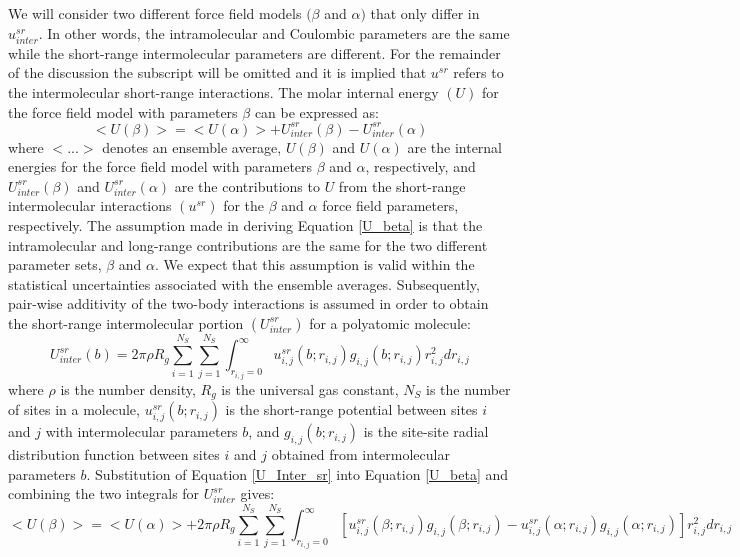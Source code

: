 \documentclass[12pt]{article}
\begin{document}
We will consider two different force field models $(\beta$ and $\alpha)$ that only differ in $u_{inter}^{sr}$. In other words, the intramolecular and Coulombic parameters are the same while the short-range intermolecular parameters are different. For the remainder of the discussion the subscript will be omitted and it is implied that $u^{sr}$ refers to the intermolecular short-range interactions. The molar internal energy $(U)$ for the force field model with parameters $\beta$ can be expressed as:
\begin{equation} \label{U_beta}
<U(\beta)> = <U(\alpha)> + U_{inter}^{sr}(\beta) - U_{inter}^{sr}(\alpha)
\end{equation}
where $<...>$ denotes an ensemble average, $U(\beta)$ and $U(\alpha)$ are the internal energies for the force field model with parameters $\beta$ and $\alpha$, respectively, and $U_{inter}^{sr}(\beta)$ and $U_{inter}^{sr}(\alpha)$ are the contributions to $U$ from the short-range intermolecular interactions $(u^{sr})$ for the $\beta$ and $\alpha$ force field parameters, respectively. The assumption made in deriving Equation \ref{U_beta} is that the intramolecular and long-range contributions are the same for the two different parameter sets, $\beta$ and $\alpha$. We expect that this assumption is valid within the statistical uncertainties associated with the ensemble averages. Subsequently, pair-wise additivity of the two-body interactions is assumed in order to obtain the short-range intermolecular portion $(U_{inter}^{sr})$ for a polyatomic molecule:
\begin{equation} \label{U_Inter_sr}
U_{inter}^{sr}(b) = 2 \pi \rho R_g \sum_{i=1}^{N_S} \sum_{j=1}^{N_S} \int_{r_{i,j}=0}^{\infty} u_{i,j}^{sr}(b;r_{i,j}) g_{i,j}(b;r_{i,j}) r_{i,j}^2 dr_{i,j}
\end{equation}
where $\rho$ is the number density, $R_g$ is the universal gas constant, $N_S$ is the number of sites in a molecule, $u_{i,j}^{sr}(b;r_{i,j})$ is the short-range potential between sites $i$ and $j$ with intermolecular parameters $b$, and $g_{i,j}(b;r_{i,j})$ is the site-site radial distribution function between sites $i$ and $j$ obtained from intermolecular parameters $b$. Substitution of Equation \ref{U_Inter_sr} into Equation \ref{U_beta} and combining the two integrals for $U_{inter}^{sr}$ gives:
\begin{equation} \label{U_exact}
<U(\beta)> = <U(\alpha)> + 2 \pi \rho R_g \sum_{i=1}^{N_S} \sum_{j=1}^{N_S} \int_{r_{i,j}=0}^{\infty} \left[u_{i,j}^{sr}(\beta;r_{i,j}) g_{i,j}(\beta;r_{i,j}) - u_{i,j}^{sr}(\alpha;r_{i,j}) g_{i,j}(\alpha;r_{i,j}) \right] r_{i,j}^2 dr_{i,j}
\end{equation}
\end{document}
